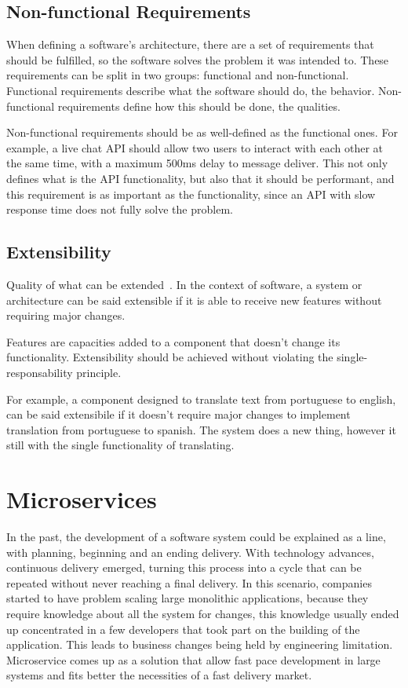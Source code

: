 \subsection*{Non-functional Requirements}
\label{sec:nonfunctional}
When defining a software's architecture, there are a set of requirements that should be fulfilled, so the software solves the problem it was intended to. These requirements can be split in two groups: functional and non-functional. Functional requirements describe what the software should do, the behavior. Non-functional requirements define how this should be done, the qualities.

Non-functional requirements should be as well-defined as the functional ones. For example, a live chat API should allow two users to interact with each other at the same time, with a maximum 500ms delay to message deliver. This not only defines what is the API functionality, but also that it should be performant, and this requirement is as important as the functionality, since an API with slow response time does not fully solve the problem.

\subsection*{Extensibility}
\label{sec:extensibility}
Quality of what can be extended~\cite{Evoluctionary}. In the context of software, a system or architecture can be said extensible if it is able to receive new features without requiring major changes. 

Features are capacities added to a component that doesn't change its functionality. Extensibility should be achieved without violating the single-responsability principle.

For example, a component designed to translate text from portuguese to english, can be said extensibile if it doesn't require major changes to implement translation from portuguese to spanish. The system does a new thing, however it still with the single functionality of translating.

\section{Microservices}
\label{sec:microservices}
In the past, the development of a software system could be explained as a line, with planning, beginning and an ending delivery. With technology advances, continuous delivery emerged, turning this process into a cycle that can be repeated without never reaching a final delivery. In this scenario, companies started to have problem scaling large monolithic applications, because they require knowledge about all the system for changes, this knowledge usually ended up concentrated in a few developers that took part on the building of the application. This leads to business changes being held by engineering limitation. Microservice comes up as a solution that allow fast pace development in large systems and fits better the necessities of a fast delivery market. 

